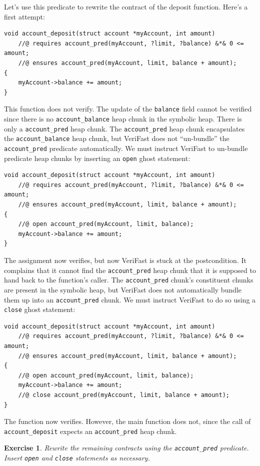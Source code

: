\documentclass{article}
\newtheorem{exercise}{Exercise}
\begin{document}
Let's use this predicate to rewrite the contract of the deposit function. Here's a first attempt:
\begin{lstlisting}
void account_deposit(struct account *myAccount, int amount)
    //@ requires account_pred(myAccount, ?limit, ?balance) &*& 0 <= amount;
    //@ ensures account_pred(myAccount, limit, balance + amount);
{
    myAccount->balance += amount;
}
\end{lstlisting}
This function does not verify. The update of the
\lstinline!balance! field cannot be verified since there is no
\lstinline!account_balance! heap chunk in the symbolic heap.
There is only a \lstinline!account_pred! heap chunk. The
\lstinline!account_pred! heap chunk encapsulates the
\lstinline!account_balance! heap chunk, but VeriFast does not
``un-bundle'' the \lstinline!account_pred! predicate
automatically. We must instruct VeriFast to un-bundle predicate
heap chunks by inserting an \lstinline!open! ghost statement:
\begin{lstlisting}
void account_deposit(struct account *myAccount, int amount)
    //@ requires account_pred(myAccount, ?limit, ?balance) &*& 0 <= amount;
    //@ ensures account_pred(myAccount, limit, balance + amount);
{
    //@ open account_pred(myAccount, limit, balance);
    myAccount->balance += amount;
}
\end{lstlisting}
The assignment now verifies, but now VeriFast is stuck at the
postcondition. It complains that it cannot find the
\lstinline!account_pred! heap chunk that it is supposed to hand
back to the function's caller. The \lstinline!account_pred!
chunk's constituent chunks are present in the symbolic heap,
but VeriFast does not automatically bundle them up into an
\lstinline!account_pred! chunk. We must instruct VeriFast to do
so using a \lstinline!close! ghost statement:
\begin{lstlisting}
void account_deposit(struct account *myAccount, int amount)
    //@ requires account_pred(myAccount, ?limit, ?balance) &*& 0 <= amount;
    //@ ensures account_pred(myAccount, limit, balance + amount);
{
    //@ open account_pred(myAccount, limit, balance);
    myAccount->balance += amount;
    //@ close account_pred(myAccount, limit, balance + amount);
}
\end{lstlisting}
The function now verifies. However, the main function does not,
since the call of \lstinline!account_deposit! expects an
\lstinline!account_pred! heap chunk.

\begin{exercise}\label{exercise:predicates}
Rewrite the remaining contracts using the
\lstinline!account_pred! predicate. Insert \lstinline!open! and
\lstinline!close! statements as necessary.
\end{exercise}
\end{document}
